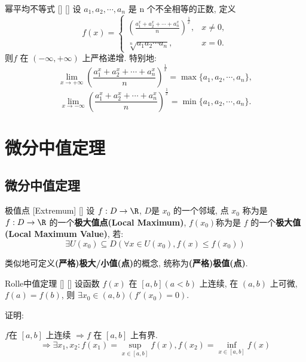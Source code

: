 \documentclass[UTF8]{ctexart}
\begin{document}
			\begin{xmp}
			    []
			    {幂平均不等式}
			    []
			    []
				 设 \(a_1, a_2, \cdots, a_n\) 是 n 个不全相等的正数, 定义
                \[f(x) = 
                \begin{cases}
                \left( \frac{a_1^x + a_2^x + \cdots + a_n^x}{n} \right)^{\frac{1}{x}}, & x \neq 0, \\
                \sqrt[n]{a_1 a_2 \cdots a_n}, & x = 0.
                \end{cases}
                \]
                则\(f\) 在 \((-\infty, +\infty)\) 上严格递增.
                特别地: 
                \[
                \lim_{x \to +\infty} \left( \frac{a_1^x + a_2^x + \cdots + a_n^x}{n} \right)^{\frac{1}{x}} = \max\{a_1, a_2, \cdots, a_n\},
                \]
                \[
                \lim_{x \to -\infty} \left( \frac{a_1^x + a_2^x + \cdots + a_n^x}{n} \right)^{\frac{1}{x}} = \min\{a_1, a_2, \cdots, a_n\}.
                \]

			\end{xmp}
		
		
	\section{微分中值定理}
		
		\subsection{微分中值定理}

			\begin{dfn}
			    []
			    {极值点}
			    [Extremum]
			    []
				设 \(f:D\to\R\), \(D\)是 \(x_0\) 的一个邻域, 点 \(x_0\) 称为是 \(f:D\to\R\) 的一个\textbf{极大值点(Local Maximum)}, \(f(x_0)\)称为是 \(f\) 的一个\textbf{极大值(Local Maximum Value)}, 若: 
				\[\exists U(x_0)\subseteq D(\forall x\in U(x_0), f(x)\leq f(x_0))\]
				
				类似地可定义\textbf{(严格)极大/小值(点)}的概念, 统称为\textbf{(严格)极值(点)}. 
			\end{dfn}
			
			\begin{thm}
			    []
			    {Rolle中值定理}
			    []
			    []
				设函数 \(f(x)\) 在 \([a,b](a<b)\) 上连续, 在 \((a,b)\) 上可微, \(f(a)=f(b)\), 则 \(\exists x_0\in (a,b)(f'(x_0)=0)\). 
			\end{thm}
			
			证明: 
			
				\(f\)在 \([a,b]\) 上连续 \(\Longrightarrow f\) 在 \([a,b]\) 上有界. 
				\[\Longrightarrow\exists x_1,x_2: f(x_1)=\sup_{x\in[a,b]}f(x), f(x_2)=\inf_{x\in[a,b]}f(x)\]
				
\end{document}
